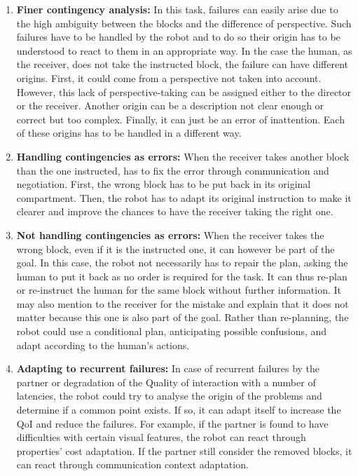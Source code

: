\begin{enumerate}

\item \textbf{Finer contingency analysis:} In this task, failures can easily arise due to the high ambiguity between the blocks and the difference of perspective. Such failures have to be handled by the robot and to do so their origin has to be understood to react to them in an appropriate way. In the case the human, as the receiver, does not take the instructed block, the failure can have different origins. First, it could come from a perspective not taken into account. However, this lack of perspective-taking can be assigned either to the director or the receiver. Another origin can be a description not clear enough or correct but too complex. Finally, it can just be an error of inattention. Each of these origins has to be handled in a different way. \label{chal:cont_analysis}

\item \textbf{Handling contingencies as errors:} When the receiver takes another block than the one instructed, has to fix the error through communication and negotiation. First, the wrong block has to be put back in its original compartment. Then, the robot has to adapt its original instruction to make it clearer and improve the chances to have the receiver taking the right one.\label{chal:cont_errors}

\item \textbf{Not handling contingencies as errors:} When the receiver takes the wrong block, even if it is the instructed one, it can however be part of the goal. In this case, the robot not necessarily has to repair the plan, asking the human to put it back as no order is required for the task. It can thus re-plan or re-instruct the human for the same block without further information. It may also mention to the receiver for the mistake and explain that it does not matter because this one is also part of the goal. Rather than re-planning, the robot could use a conditional plan, anticipating possible confusions, and adapt according to the human's actions.\label{chal:cont_not_errors}

\item \textbf{Adapting to recurrent failures:} In case of recurrent failures by the partner or degradation of the Quality of interaction with a number of latencies, the robot could try to analyse the origin of the problems and determine if a common point exists. If so, it can adapt itself to increase the QoI and reduce the failures. For example, if the partner is found to have difficulties with certain visual features, the robot can react through properties' cost adaptation. If the partner still consider the removed blocks, it can react through communication context adaptation.\label{chal:change}


\end{enumerate}
